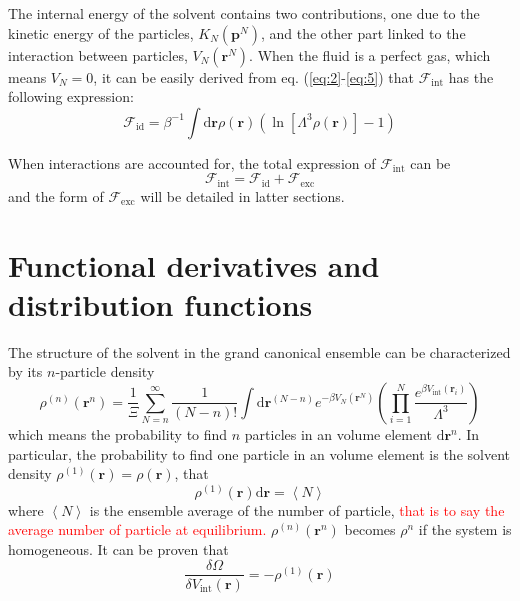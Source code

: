 The internal energy of the solvent contains two contributions, one
due to the kinetic energy of the particles, $K_{N}(\mathbf{p}^{N})$,
and the other part linked to the interaction between particles, $V_{N}(\mathbf{r}^{N})$.
When the fluid is a perfect gas, which means $V_{N}=0$, it can be
easily derived from eq. (\ref{eq:2}-\ref{eq:5}) that $\mathcal{F}_{\mathrm{int}}$
has the following expression:
\begin{equation}
\mathcal{F}_{\mathrm{id}}=\beta^{-1}\int\mathrm{d}\mathbf{r}\rho(\mathbf{r})\left(\ln\left[\Lambda^{3}\rho(\mathbf{r})\right]-1\right)
\end{equation}

When interactions are accounted for, the total expression of $\mathcal{F}_{\mathrm{int}}$
can be
\begin{equation}
\mathcal{F}_{\mathrm{int}}=\mathcal{F}_{\mathrm{id}}+\mathcal{F}_{\mathrm{exc}}\label{eq:f-int-def}
\end{equation}
and the form of $\mathcal{F}_{\mathrm{exc}}$ will be detailed in
latter sections.

\section{Functional derivatives and distribution functions}

The structure of the solvent in the grand canonical ensemble can be
characterized by its $n$-particle density 
\begin{equation}
\rho^{(n)}(\mathbf{r}^{n})=\dfrac{1}{\Xi}\sum_{N=n}^{\infty}\dfrac{1}{(N-n)!}\int\mathrm{d}\mathbf{r}^{\left(N-n\right)}e^{-\beta V_{N}(\mathbf{r}^{N})}\left(\prod_{i=1}^{N}\frac{e^{\beta V_{\mathrm{int}}(\mathbf{r}_{i})}}{\Lambda^{3}}\right)\label{eq:def-rho}
\end{equation}
which means the probability to find $n$ particles in an volume element
$\mathrm{d}\mathbf{r}^{n}$. In particular, the probability to find
one particle in an volume element is the solvent density $\rho^{(1)}(\mathbf{r})=\rho(\mathbf{r})$,
that 
\begin{equation}
\rho^{(1)}(\mathbf{r})\mathrm{d}\mathbf{r}=\left\langle N\right\rangle 
\end{equation}
where $\left\langle N\right\rangle $ is the ensemble average of the
number of particle, \textcolor{red}{that is to say the average number
of particle at equilibrium.} $\rho^{(n)}(\mathbf{r}^{n})$ becomes
$\rho^{n}$ if the system is homogeneous. It can be proven that
\begin{equation}
\dfrac{\delta\Omega}{\delta V_{\mathrm{int}}(\mathbf{r})}=-\rho^{(1)}(\mathbf{r})
\end{equation}

